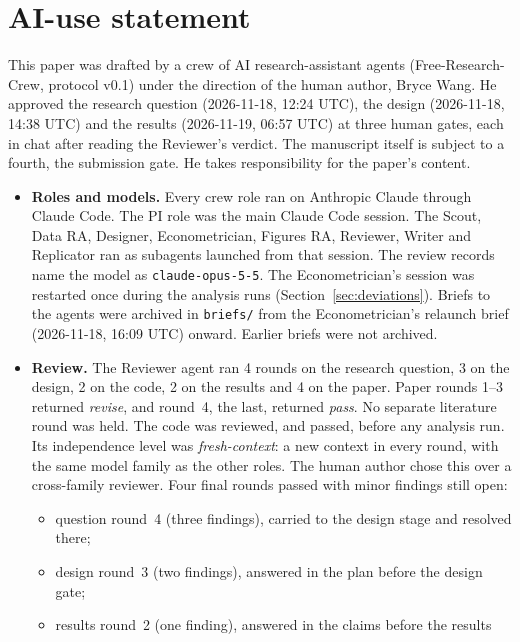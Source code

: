 \section*{AI-use statement}

This paper was drafted by a crew of AI research-assistant agents
(Free-Research-Crew, protocol v0.1) under the direction of the human author, Bryce Wang.
He approved the research question (2026-11-18, 12:24 UTC), the design (2026-11-18,
14:38 UTC) and the results (2026-11-19, 06:57 UTC) at three human gates, each in chat
after reading the Reviewer's verdict. The manuscript itself is subject to a fourth, the
submission gate. He takes responsibility for the paper's content.

\begin{itemize}
  \item \textbf{Roles and models.} Every crew role ran on Anthropic Claude through Claude
        Code. The PI role was the main Claude Code session. The Scout, Data RA, Designer,
        Econometrician, Figures RA, Reviewer, Writer and Replicator ran as subagents
        launched from that session. The review records name the model as
        \texttt{claude-opus-5-5}. The Econometrician's session was restarted once during
        the analysis runs (Section~\ref{sec:deviations}). Briefs to the agents were archived
        in \texttt{briefs/} from the Econometrician's relaunch brief (2026-11-18, 16:09 UTC)
        onward. Earlier briefs were not archived.
  \item \textbf{Review.} The Reviewer agent ran 4 rounds on the research question, 3 on the
        design, 2 on the code, 2 on the results and 4 on the paper. Paper rounds 1--3
        returned \emph{revise}, and round~4, the last, returned \emph{pass}. No separate
        literature round was held. The code was reviewed, and passed,
        before any analysis run. Its independence level was \emph{fresh-context}: a new
        context in every round, with the same model family as the other roles. The human
        author chose this over a cross-family reviewer. Four final rounds passed with
        minor findings still open:
        \begin{itemize}
          \item question round~4 (three findings), carried to the design stage and resolved
                there;
          \item design round~3 (two findings), answered in the plan before the design gate;
          \item results round~2 (one finding), answered in the claims before the results

\end{itemize}
\end{itemize}
